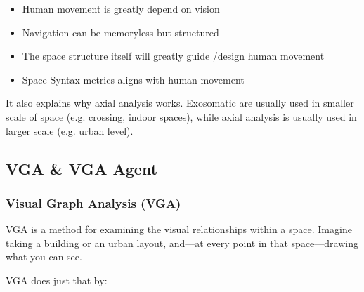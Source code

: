 \documentclass[a4paper, openany]{book}
\begin{document}
\begin{itemize}
  \item Human movement is greatly depend on vision
  \item Navigation can be memoryless but structured
  \item The space structure itself will greatly guide \slash design human movement
  \item Space Syntax metrics aligns with human movement
\end{itemize}

It also explains why axial analysis works. Exosomatic are usually used in smaller scale of space (e.g. crossing, indoor spaces), while axial analysis is usually used in larger scale (e.g. urban level).

\subsection{VGA \& VGA Agent}

\subsubsection{Visual Graph Analysis (VGA)}

VGA is a method for examining the visual relationships within a space. Imagine taking a building or an urban layout, and---at every point in that space---drawing what you can see.

VGA does just that by:
\end{document}
